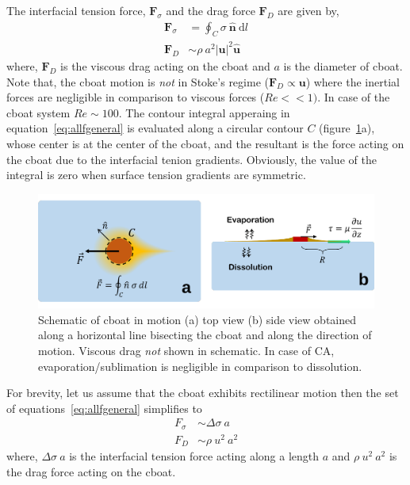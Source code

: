 \documentclass[journal=langd5, manuscript=article, layout=twocolumn]{achemso}
\newcommand{\td}[1]{\mathrm{d}#1}
\begin{document}
The interfacial tension force, $\mathbf{F}_{\sigma}$ and the drag force $\mathbf{F}_{D}$ are given by,
\begin{equation}\label{eq:allfgeneral}
\begin{aligned}
\mathbf{F}_{\sigma} &= \oint_{C} \sigma \ \hat{\mathbf{n}} \ \td{l} \\
\mathbf{F}_{D} &\sim \rho\ a^{2} \left|\mathbf{u}\right|^{2} \hat{\mathbf{u}}
\end{aligned}
\end{equation}
where, $\mathbf{F}_{D}$ is the viscous drag acting on the cboat and $a$ is the diameter of cboat. Note that, the cboat motion is \emph{not} in Stoke's regime ($\mathbf{F}_{D} \propto \mathbf{u}$) where the inertial forces are negligible in comparison to viscous forces ($\mathit{Re} << 1)$. In case of the cboat system $\mathit{Re} \sim 100$. The contour integral apperaing in equation~\ref{eq:allfgeneral} is evaluated along a circular contour $C$ (figure~\ref{fig:schematic}a), whose center is at the center of the cboat, and the resultant is the force acting on the cboat due to the interfacial tenion gradients. Obviously, the value of the integral is zero when surface tension gradients are symmetric. 
\begin{figure}[ht]
    \centering
	\includegraphics[width=\linewidth]{figure4.pdf}
	\caption{Schematic of cboat in motion (a) top view (b) side view obtained along a horizontal line bisecting the cboat and along the direction of motion. Viscous drag \emph{not} shown in schematic. In case of CA, evaporation/sublimation is negligible in comparison to dissolution.}\label{fig:schematic}
\end{figure}

For brevity, let us assume that the cboat exhibits rectilinear motion then the set of equations~\ref{eq:allfgeneral} simplifies to
\begin{equation}\label{eq:allfsimple}
\begin{aligned}
F_{\sigma} &\sim \Delta\sigma\ a \\
F_{D} &\sim \rho\ u^{2}\ a^{2}
\end{aligned}
\end{equation}
where, $\Delta\sigma\ a$ is the interfacial tension force acting along a length $a$ and $\rho\ u^{2}\ a^{2}$ is the drag force acting on the cboat.
\end{document}
